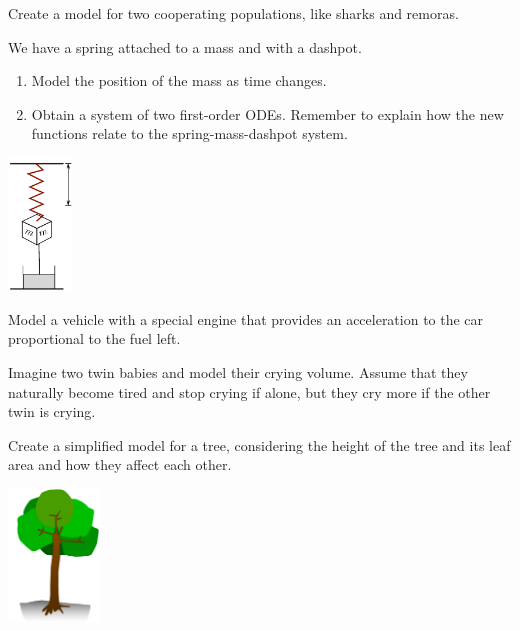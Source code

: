 \begin{exercises}

	\begin{problist}
	
	\prob Create a model for two cooperating populations, like sharks and remoras. 
	
	
	
	
	\begin{minipage}{.35\textwidth}
		\prob We have a spring attached to a mass and with a dashpot. 
		\begin{enumerate}
			\item Model the position of the mass as time changes.
			\item Obtain a system of two first-order ODEs. Remember to explain how the new functions relate to the spring-mass-dashpot system.
		\end{enumerate}
	\end{minipage}
	\hfill
	\begin{minipage}{100pt}
		\includegraphics*[height=100pt]{images/module16-spring-mass-dashpot.pdf}
	\end{minipage}

	\prob Model a vehicle with a special engine that provides an acceleration to the car proportional to the fuel left.
	
	\prob Imagine two twin babies and model their crying volume. Assume that they naturally become tired and stop crying if alone, but they cry more if the other twin is crying.
	
	
	
	\begin{minipage}{.35\textwidth}
		\prob Create a simplified model for a tree, considering the height of the tree and its leaf area and how they affect each other.	
	\end{minipage}
	\hfill
	\begin{minipage}{100pt}
		\includegraphics*[height=100pt]{images/module16-tree.pdf}
	\end{minipage}


\end{problist}
\end{exercises}
